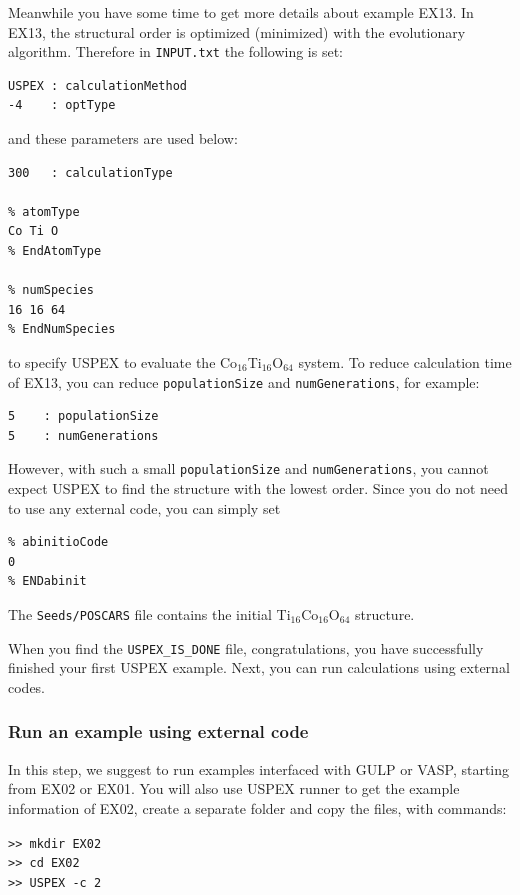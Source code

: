\documentclass[12pt]{article}
\newcommand{\keyword}[1]{\texttt{#1}}
\newcommand{\file}[1]{\texttt{#1}}
\begin{document}
Meanwhile you have some time to get more details about example EX13. In EX13,
the structural order is optimized (minimized) with the evolutionary algorithm.
Therefore in \file{INPUT.txt} the following is set:

{\small\begin{verbatim}
USPEX : calculationMethod
-4    : optType
\end{verbatim}}

and these parameters are used below:
{\small\begin{verbatim}
300   : calculationType

% atomType
Co Ti O
% EndAtomType

% numSpecies
16 16 64
% EndNumSpecies
\end{verbatim}}

to specify USPEX to evaluate the Co$_{16}$Ti$_{16}$O$_{64}$ system. To reduce
calculation time of EX13, you can reduce \keyword{populationSize} and
\keyword{numGenerations}, for example:
{\small\begin{verbatim}
5    : populationSize
5    : numGenerations
\end{verbatim}}

However, with such a small \keyword{populationSize} and
\keyword{numGenerations}, you cannot expect USPEX to find the structure with the
lowest order. Since you do not need to use any external code, you can simply set
{\small\begin{verbatim}
% abinitioCode
0
% ENDabinit
\end{verbatim}}

The \file{Seeds/POSCARS} file contains the initial Ti$_{16}$Co$_{16}$O$_{64}$
structure.

When you find the \file{USPEX\_IS\_DONE} file, congratulations, you have
successfully finished your first USPEX example. Next, you can run calculations
using external codes.

\subsubsection{Run an example using external code}
In this step, we suggest to run examples interfaced with GULP or VASP, starting
from EX02 or EX01. You will also use USPEX runner to get the example information
of EX02, create a separate folder and copy the files, with commands:
 
\texttt{>> mkdir EX02}\\
\texttt{>> cd EX02}\\
\texttt{>> USPEX -c 2}\\
\end{document}
